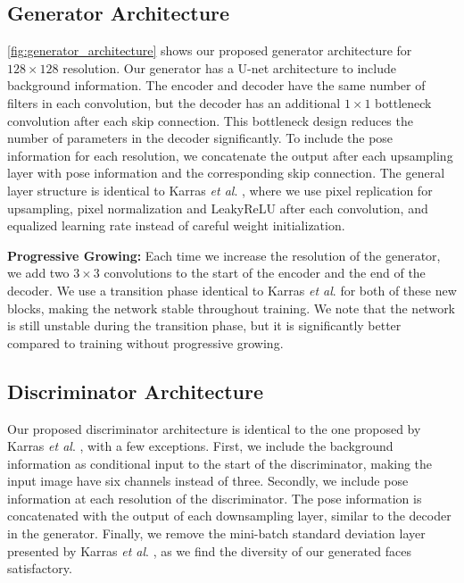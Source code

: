 \documentclass[runningheads]{llncs}
\newcommand{\etal}{\textit{et al}. }
\begin{document}
\subsection{Generator Architecture}

\autoref{fig:generator_architecture} shows our proposed generator architecture for $128 \times 128$ resolution. Our generator has a U-net \cite{ronneberger2015u} architecture to include background information.
The encoder and decoder have the same number of filters in each convolution, but the decoder has an additional $1\times 1$ bottleneck convolution after each skip connection. This bottleneck design reduces the number of parameters in the decoder significantly. To include the pose information for each resolution, we concatenate the output after each upsampling layer with pose information and the corresponding skip connection. The general layer structure is identical to Karras \etal \cite{Karras2017}, where we use pixel replication for upsampling, pixel normalization and LeakyReLU after each convolution, and equalized learning rate instead of careful weight initialization. 

\textbf{Progressive Growing:} Each time we increase the resolution of the generator, we add two $3 \times 3$ convolutions to the start of the encoder and the end of the decoder. We use a transition phase identical to Karras \etal \cite{Karras2017} for both of these new blocks, making the network stable throughout training. We note that the network is still unstable during the transition phase, but it is significantly better compared to training without progressive growing. 



\subsection{Discriminator Architecture}

Our proposed discriminator architecture is identical to the one proposed by Karras \etal \cite{Karras2017}, with a few exceptions. First, we include the background information as conditional input to the start of the discriminator, making the input image have six channels instead of three. Secondly, we include pose information at each resolution of the discriminator. The pose information is concatenated with the output of each downsampling layer, similar to the decoder in the generator. Finally, we remove the mini-batch standard deviation layer presented by Karras \etal \cite{Karras2017}, as we find the diversity of our generated faces satisfactory.
\end{document}

